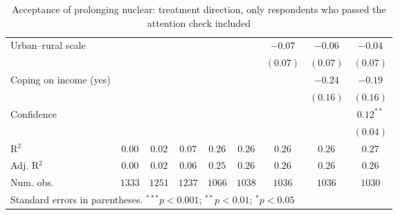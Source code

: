 \begin{table}[h]
\begin{center}
\begin{tabular}{l c c c c c c c c}
Urban–rural scale                                                               &              &               &               &               &               & $-0.07$       & $-0.06$       & $-0.04$       \\
                                                                                &              &               &               &               &               & $(0.07)$      & $(0.07)$      & $(0.07)$      \\
Coping on income (yes)                                                          &              &               &               &               &               &               & $-0.24$       & $-0.19$       \\
                                                                                &              &               &               &               &               &               & $(0.16)$      & $(0.16)$      \\
Confidence                                                                      &              &               &               &               &               &               &               & $0.12^{**}$   \\
                                                                                &              &               &               &               &               &               &               & $(0.04)$      \\
\hline
R$^2$                                                                           & $0.00$       & $0.02$        & $0.07$        & $0.26$        & $0.26$        & $0.26$        & $0.26$        & $0.27$        \\
Adj. R$^2$                                                                      & $0.00$       & $0.02$        & $0.06$        & $0.25$        & $0.26$        & $0.26$        & $0.26$        & $0.26$        \\
Num. obs.                                                                       & $1333$       & $1251$        & $1237$        & $1066$        & $1038$        & $1036$        & $1036$        & $1030$        \\
\hline
\multicolumn{9}{l}{\scriptsize{Standard errors in parentheses. $^{***}p<0.001$; $^{**}p<0.01$; $^{*}p<0.05$}}
\end{tabular}
\caption{Acceptance of prolonging nuclear: treatment direction, only respondents who passed the attention check included}
\label{table:acceptance_prolong_nucs_speeders_excluded}
\end{center}
\end{table}
